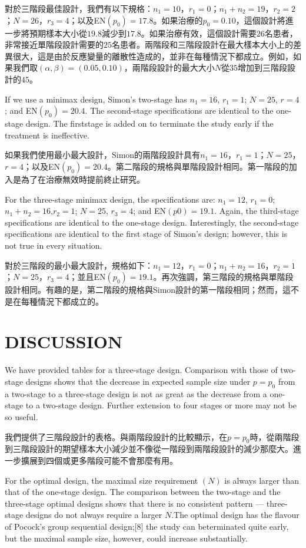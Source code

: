 對於三階段最佳設計，我們有以下規格：$n_1=10$，$r_1=0$；$n_1+n_2=19$，$r_2=2$；$N=26$，$r_3=4$；以及EN$(p_0)=17.8$。如果治療的$p_0=0.10$，這個設計將進一步將預期樣本大小從$19.8$減少到$17.8$。如果治療有效，這個設計需要$26$名患者，非常接近單階段設計需要的$25$名患者。兩階段和三階段設計在最大樣本大小上的差異很大，這是由於反應變量的離散性造成的，並非在每種情況下都成立。例如，如果我們取$(\alpha, \beta)=(0.05, 0.10)$，兩階段設計的最大大小$N$從$35$增加到三階段設計的$45$。

If we use a minimax design, Simon’s two-stage has $n_1=16$, $r_1=1$; $N=25$, $r=4$; and EN$(p_0)=20.4$. The second-stage specifications are identical to the one-stage design. The firststage is added on to terminate the study early if the treatment is ineffective.

如果我們使用最小最大設計，Simon的兩階段設計具有$n_1=16$，$r_1=1$；$N=25$，$r=4$；以及EN$(p_0)=20.4$。第二階段的規格與單階段設計相同。第一階段的加入是為了在治療無效時提前終止研究。

For the three-stage minimax design, the specifications are: $n_1=12$, $r_1=0$; $n_1+n_2=16$,$r_2=1$; $N=25$, $r_3=4$; and EN$(p0)=19.1$. Again, the third-stage specifications are identical to the one-stage design. Interestingly, the second-stage specifications are identical to the first stage of Simon’s design; however, this is not true in every situation.

對於三階段的最小最大設計，規格如下：$n_1=12$，$r_1=0$；$n_1+n_2=16$，$r_2=1$；$N=25$，$r_3=4$；並且EN$(p_0)=19.1$。再次強調，第三階段的規格與單階段設計相同。有趣的是，第二階段的規格與Simon設計的第一階段相同；然而，這不是在每種情況下都成立的。

\section{DISCUSSION}
We have provided tables for a three-stage design. Comparison with those of two-stage designs shows that the decrease in expected sample size under $p=p_0$ from a two-stage to a three-stage design is not as great as the decrease from a one-stage to a two-stage design. Further extension to four stages or more may not be so useful.


我們提供了三階段設計的表格。與兩階段設計的比較顯示，在$p=p_0$時，從兩階段到三階段設計的期望樣本大小減少並不像從一階段到兩階段設計的減少那麼大。進一步擴展到四個或更多階段可能不會那麼有用。

For the optimal design, the maximal size requirement $(N)$ is always larger than that of the one-stage design. The comparison between the two-stage and the three-stage optimal designs shows that there is no consistent pattern — three-stage designs do not always require a larger $N$.The optimal design has the flavour of Pocock’s group sequential design;[8] the study can beterminated quite early, but the maximal sample size, however, could increase substantially.

